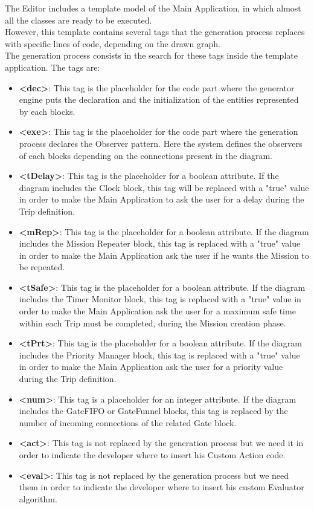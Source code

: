 The Editor includes a template model of the Main Application, in which almost all the classes are ready to be executed.
\\
However, this template contains several tags that the generation process replaces with specific lines of code, depending on the drawn graph.
\\
The generation process consists in the search for these tags inside the template application. 
The tags are:
\\

\begin{itemize}
\item{\textbf{<dec>}: This tag is the placeholder for the code part where the generator engine puts the declaration and the initialization of the entities represented by each blocks.
}
\item{\textbf{<exe>}: This tag is the placeholder for the code part where the generation process declares the Observer pattern. Here the system defines the observers of each blocks depending on the connections present in the diagram. 
}
\item{\textbf{<tDelay>}: This tag is the placeholder for a boolean attribute. If the diagram includes the Clock block, this tag will be replaced with a "true" value in order to make the Main Application to ask the user for a delay during the Trip definition.
}
\item{\textbf{<mRep>}: This tag is the placeholder for a boolean attribute. If the diagram includes the Mission Repeater block, this tag is replaced with a "true" value in order to make the Main Application ask the user if he wants the Mission to be repeated.
}
\item{\textbf{<tSafe>}: This tag is the placeholder for a boolean attribute. If the diagram includes the Timer Monitor block, this tag is replaced with a "true" value in order to make the Main Application ask the user for a maximum safe time within each Trip must be completed, during the Mission creation phase.
}
\item{\textbf{<tPrt>}: This tag is the placeholder for a boolean attribute. If the diagram includes the Priority Manager block, this tag is replaced with a "true" value in order to make the Main Application ask the user for a priority value during the Trip definition.
}
\item{\textbf{<num>}: This tag is a placeholder for an integer attribute. If the diagram includes the GateFIFO or GateFunnel blocks, this tag is replaced by the number of incoming connections of the related Gate block.
}
\item{\textbf{<act>}: This tag is not replaced by the generation process but we need it in order to indicate the developer where to insert his Custom Action code.
}
\item{\textbf{<eval>}: This tag is not replaced by the generation process but we need them in order to indicate the developer where to insert his custom Evaluator algorithm. 
}
\end{itemize}

